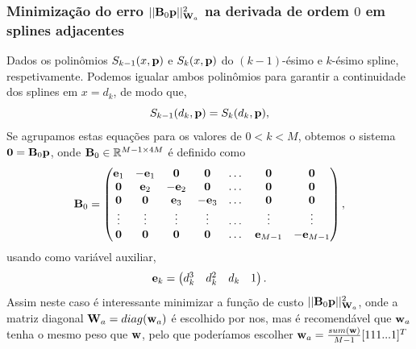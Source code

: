 \subsubsection{Minimização do erro $||\MATRIX{B}_0\VECTOR{p}||^2_{\MATRIX{W}_a}$ na derivada de ordem $0$ em splines adjacentes}
\label{subsubsec:part0}
Dados os polinômios $S_{k-1}(x,\VECTOR{p})$ e $S_{k}(x,\VECTOR{p})$ do $(k-1)$-ésimo e $k$-ésimo spline,
respetivamente. Podemos igualar ambos polinômios para garantir a continuidade dos splines em $x=d_{k}$, 
de modo que,
\begin{equation}
 S_{k-1}(d_{k},\VECTOR{p})=S_{k}(d_{k},\VECTOR{p}),
\end{equation}
Se agrupamos estas equações para os valores de  $0<k<M$, obtemos o sistema $\mathbf{0}=\MATRIX{B}_0 \VECTOR{p}$, 
onde $\MATRIX{B}_0 \in \mathbb{R}^{M-1 \times 4M}$ é definido como
\begin{equation}
\MATRIX{B}_0 =\left(\begin{matrix}
\VECTOR{e}_1 & -\VECTOR{e}_1   & \mathbf{0}    &  \mathbf{0}   & \dots & \mathbf{0} & \mathbf{0}\\
\mathbf{0}   &  \VECTOR{e}_2   & -\VECTOR{e}_2 &  \mathbf{0}   & \dots & \mathbf{0} & \mathbf{0}\\
\mathbf{0}   &  \mathbf{0}     &  \VECTOR{e}_3 & -\VECTOR{e}_3 & \dots & \mathbf{0} & \mathbf{0}\\
\vdots       &  \vdots         &  \vdots       &  \vdots       & \dots & \vdots     & \vdots\\
\mathbf{0}   &  \mathbf{0}     &  \mathbf{0}   &  \mathbf{0}   & \dots & \VECTOR{e}_{M-1} & -\VECTOR{e}_{M-1} \\
\end{matrix}\right),
\end{equation}
usando como variável auxiliar, 
\begin{equation}
\VECTOR{e}_k =\left(\begin{matrix}
d^3_k & d^2_k   & d_k & 1  \\
\end{matrix}\right).
\end{equation}
Assim neste caso é interessante minimizar a função de custo $||\MATRIX{B}_0\VECTOR{p}||^2_{\MATRIX{W}_a}$,
onde a matriz diagonal $\MATRIX{W}_a=diag(\VECTOR{w}_a)$ é escolhido por nos, 
mas é recomendável que $\VECTOR{w}_a$ tenha o mesmo peso que $\VECTOR{w}$,
pelo que poderíamos escolher $\VECTOR{w}_a=\frac{sum(\VECTOR{w})}{M-1}[1 1 1 ... 1]^T$
